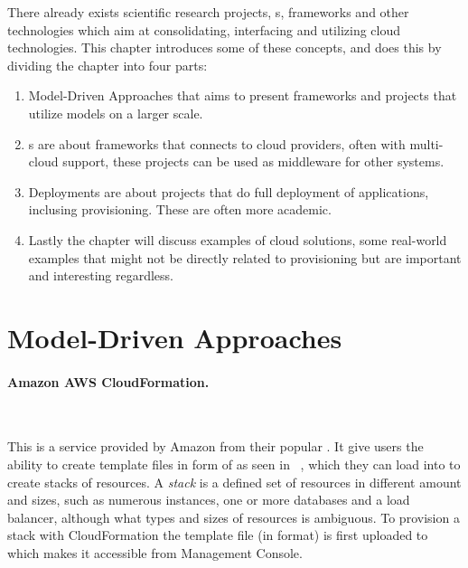 
There already exists scientific research projects, s, frameworks 
and other technologies which aim at consolidating, interfacing and utilizing cloud technologies.
This chapter introduces some of these concepts, and does this by dividing the chapter into four parts:
\begin{enumerate}
  \item Model-Driven Approaches that aims to present frameworks and projects that utilize
  models on a larger scale.
  \item {}s are about frameworks that connects to cloud providers, often with multi-cloud support,
  these projects can be used as middleware for other systems.
  \item Deployments are about projects that do full deployment of applications, inclusing provisioning.
  These are often more academic.
  \item Lastly the chapter will discuss examples of cloud solutions, some real-world examples
  that might not be directly related to provisioning but are important and interesting regardless.
\end{enumerate}

\section{Model-Driven Approaches}

\paragraph{Amazon AWS CloudFormation.}~\cite{aws}



This is a service provided by Amazon from their popular .
It give users the ability to create template files in form of 
 as seen in ~, 
which they can load into  to create stacks of resources. 
A \emph{stack} is a defined set of resources in different amount and sizes, 
such as numerous instances,
one or more databases and a load balancer, although what types and sizes of resources is ambiguous.
To provision a stack with CloudFormation the template file (in  format) is first uploaded to
 which makes it accessible from  Management Console.

